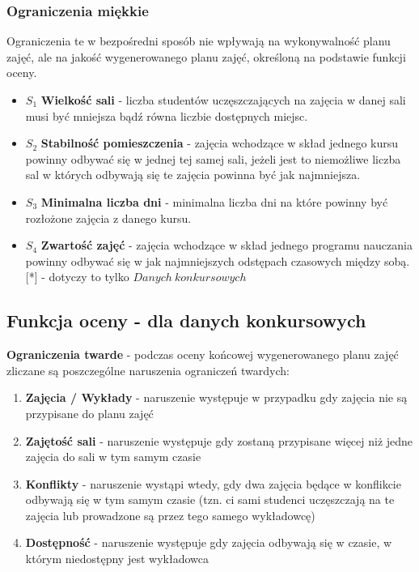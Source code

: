 \subsubsection{Ograniczenia miękkie}
Ograniczenia te w bezpośredni sposób nie wpływają na wykonywalność planu zajęć, ale na jakość wygenerowanego planu zajęć, określoną na podstawie funkcji oceny.
\begin{itemize}
\item  ${S_{1}}$ \textbf{Wielkość sali} - liczba studentów uczęszczających na zajęcia w danej sali musi być mniejsza bądź równa liczbie dostępnych miejsc.
\item  ${S_{2}}$ \textbf{Stabilność pomieszczenia} - zajęcia wchodzące w skład jednego kursu powinny odbywać się w jednej tej samej sali, jeżeli jest to niemożliwe liczba sal w których odbywają się te zajęcia powinna być jak najmniejsza.
\item  ${S_{3}}$ \textbf{Minimalna liczba dni} - minimalna liczba dni na które powinny być rozłożone zajęcia z danego kursu.
\item  ${S_{4}}$ \textbf{Zwartość zajęć} - zajęcia wchodzące w skład jednego programu nauczania powinny odbywać się w jak najmniejszych odstępach czasowych między sobą. [*] - dotyczy to tylko $Danych\ konkursowych$
\end{itemize}
\subsection{Funkcja oceny - dla danych konkursowych}
\textbf{Ograniczenia twarde} - podczas oceny końcowej wygenerowanego planu zajęć zliczane są poszczególne naruszenia ograniczeń twardych:\\
\begin{enumerate}
\item \textbf{Zajęcia / Wykłady} - naruszenie występuje w przypadku gdy zajęcia nie są przypisane do planu zajęć
\item \textbf{Zajętość sali} - naruszenie występuje gdy zostaną przypisane więcej niż jedne zajęcia do sali w tym samym czasie
\item \textbf{Konflikty} - naruszenie wystąpi wtedy, gdy dwa zajęcia będące w konflikcie odbywają się w tym samym czasie (tzn. ci sami studenci uczęszczają na te zajęcia lub prowadzone są przez tego samego wykładowcę)
\item \textbf{Dostępność} - naruszenie występuje gdy zajęcia odbywają się w czasie, w którym niedostępny jest wykładowca 
\end{enumerate} 

